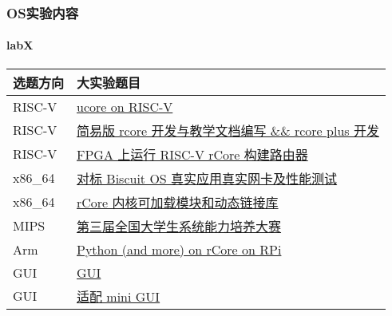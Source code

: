 \begin{frame}
	\frametitle{OS实验内容}
	\framesubtitle{labX}
	
\begin{longtable}[]{@{}|l|l|@{}}
	\toprule
	选题方向 & 大实验题目\tabularnewline
	\midrule
	\endhead
	RISC-V &
	\href{http://os.cs.tsinghua.edu.cn/oscourse/OS2019spring/projects/g01}{ucore
		on RISC-V}\tabularnewline  \hline
	RISC-V &
	\href{http://os.cs.tsinghua.edu.cn/oscourse/OS2019spring/projects/g02}{简易版
		rcore 开发与教学文档编写 \&\& rcore plus 开发}\tabularnewline \hline
	RISC-V &
	\href{http://os.cs.tsinghua.edu.cn/oscourse/OS2019spring/projects/g05}{FPGA
		上运行 RISC-V rCore 构建路由器}\tabularnewline \hline
	x86\_64 &
	\href{http://os.cs.tsinghua.edu.cn/oscourse/OS2019spring/projects/g04}{对标
		Biscuit OS 真实应用真实网卡及性能测试}\tabularnewline \hline
	x86\_64 &
	\href{http://os.cs.tsinghua.edu.cn/oscourse/OS2019spring/projects/g06}{rCore
		内核可加载模块和动态链接库}\tabularnewline \hline
	MIPS &
	\href{http://os.cs.tsinghua.edu.cn/oscourse/OS2019spring/projects/g03}{第三届全国大学生系统能力培养大赛}\tabularnewline \hline
	Arm &
	\href{http://os.cs.tsinghua.edu.cn/oscourse/OS2019spring/projects/g11}{Python
		(and more) on rCore on RPi}\tabularnewline \hline
	GUI &
	\href{http://os.cs.tsinghua.edu.cn/oscourse/OsTrain2019/g2}{GUI}\tabularnewline \hline
	GUI & \href{http://os.cs.tsinghua.edu.cn/oscourse/OsTrain2019/g3}{适配
		mini GUI}\tabularnewline \hline

	
	\bottomrule
\end{longtable}


\end{frame}



